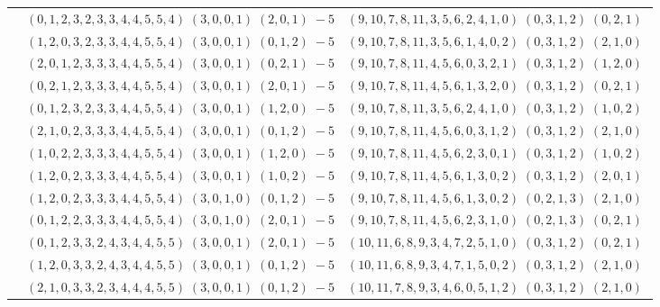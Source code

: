 \documentclass[11pt]{article}
\begin{document}
\begin{longtable}[l]{|c|c|c|}
 \cline{2-3} 
 & $(0 ,1 ,2 ,3 ,2 ,3 ,3 ,4 ,4 ,5 ,5 ,4) \;(3 ,0 ,0 ,1) \;(2 ,0 ,1) \;-5$ & $(9 ,10 ,7 ,8 ,11 ,3 ,5 ,6 ,2 ,4 ,1 ,0) \;(0 ,3 ,1 ,2) \;(0 ,2 ,1) \;$\\ 
 \cline{2-3} 
 & $(1 ,2 ,0 ,3 ,2 ,3 ,3 ,4 ,4 ,5 ,5 ,4) \;(3 ,0 ,0 ,1) \;(0 ,1 ,2) \;-5$ & $(9 ,10 ,7 ,8 ,11 ,3 ,5 ,6 ,1 ,4 ,0 ,2) \;(0 ,3 ,1 ,2) \;(2 ,1 ,0) \;$\\ 
 \cline{2-3} 
 & $(2 ,0 ,1 ,2 ,3 ,3 ,3 ,4 ,4 ,5 ,5 ,4) \;(3 ,0 ,0 ,1) \;(0 ,2 ,1) \;-5$ & $(9 ,10 ,7 ,8 ,11 ,4 ,5 ,6 ,0 ,3 ,2 ,1) \;(0 ,3 ,1 ,2) \;(1 ,2 ,0) \;$\\ 
 \cline{2-3} 
 & $(0 ,2 ,1 ,2 ,3 ,3 ,3 ,4 ,4 ,5 ,5 ,4) \;(3 ,0 ,0 ,1) \;(2 ,0 ,1) \;-5$ & $(9 ,10 ,7 ,8 ,11 ,4 ,5 ,6 ,1 ,3 ,2 ,0) \;(0 ,3 ,1 ,2) \;(0 ,2 ,1) \;$\\ 
 \cline{2-3} 
 & $(0 ,1 ,2 ,3 ,2 ,3 ,3 ,4 ,4 ,5 ,5 ,4) \;(3 ,0 ,0 ,1) \;(1 ,2 ,0) \;-5$ & $(9 ,10 ,7 ,8 ,11 ,3 ,5 ,6 ,2 ,4 ,1 ,0) \;(0 ,3 ,1 ,2) \;(1 ,0 ,2) \;$\\ 
 \cline{2-3} 
 & $(2 ,1 ,0 ,2 ,3 ,3 ,3 ,4 ,4 ,5 ,5 ,4) \;(3 ,0 ,0 ,1) \;(0 ,1 ,2) \;-5$ & $(9 ,10 ,7 ,8 ,11 ,4 ,5 ,6 ,0 ,3 ,1 ,2) \;(0 ,3 ,1 ,2) \;(2 ,1 ,0) \;$\\ 
 \cline{2-3} 
 & $(1 ,0 ,2 ,2 ,3 ,3 ,3 ,4 ,4 ,5 ,5 ,4) \;(3 ,0 ,0 ,1) \;(1 ,2 ,0) \;-5$ & $(9 ,10 ,7 ,8 ,11 ,4 ,5 ,6 ,2 ,3 ,0 ,1) \;(0 ,3 ,1 ,2) \;(1 ,0 ,2) \;$\\ 
 \cline{2-3} 
 & $(1 ,2 ,0 ,2 ,3 ,3 ,3 ,4 ,4 ,5 ,5 ,4) \;(3 ,0 ,0 ,1) \;(1 ,0 ,2) \;-5$ & $(9 ,10 ,7 ,8 ,11 ,4 ,5 ,6 ,1 ,3 ,0 ,2) \;(0 ,3 ,1 ,2) \;(2 ,0 ,1) \;$\\ 
 \cline{2-3} 
 & $(1 ,2 ,0 ,2 ,3 ,3 ,3 ,4 ,4 ,5 ,5 ,4) \;(3 ,0 ,1 ,0) \;(0 ,1 ,2) \;-5$ & $(9 ,10 ,7 ,8 ,11 ,4 ,5 ,6 ,1 ,3 ,0 ,2) \;(0 ,2 ,1 ,3) \;(2 ,1 ,0) \;$\\ 
 \cline{2-3} 
 & $(0 ,1 ,2 ,2 ,3 ,3 ,3 ,4 ,4 ,5 ,5 ,4) \;(3 ,0 ,1 ,0) \;(2 ,0 ,1) \;-5$ & $(9 ,10 ,7 ,8 ,11 ,4 ,5 ,6 ,2 ,3 ,1 ,0) \;(0 ,2 ,1 ,3) \;(0 ,2 ,1) \;$\\ 
 \cline{2-3} 
 & $(0 ,1 ,2 ,3 ,3 ,2 ,4 ,3 ,4 ,4 ,5 ,5) \;(3 ,0 ,0 ,1) \;(2 ,0 ,1) \;-5$ & $(10 ,11 ,6 ,8 ,9 ,3 ,4 ,7 ,2 ,5 ,1 ,0) \;(0 ,3 ,1 ,2) \;(0 ,2 ,1) \;$\\ 
 \cline{2-3} 
 & $(1 ,2 ,0 ,3 ,3 ,2 ,4 ,3 ,4 ,4 ,5 ,5) \;(3 ,0 ,0 ,1) \;(0 ,1 ,2) \;-5$ & $(10 ,11 ,6 ,8 ,9 ,3 ,4 ,7 ,1 ,5 ,0 ,2) \;(0 ,3 ,1 ,2) \;(2 ,1 ,0) \;$\\ 
 \cline{2-3} 
 & $(2 ,1 ,0 ,3 ,3 ,2 ,3 ,4 ,4 ,4 ,5 ,5) \;(3 ,0 ,0 ,1) \;(0 ,1 ,2) \;-5$ & $(10 ,11 ,7 ,8 ,9 ,3 ,4 ,6 ,0 ,5 ,1 ,2) \;(0 ,3 ,1 ,2) \;(2 ,1 ,0) \;$\\ 

\end{longtable}
\end{document}
